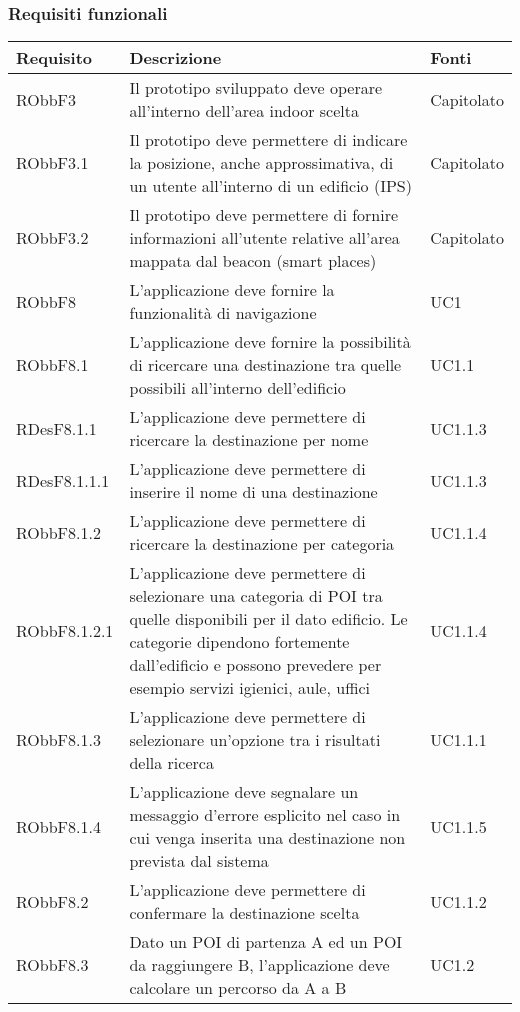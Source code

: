 \documentclass[../AnalisiDeiRequisiti.tex]{subfiles}
\begin{document}
\subsubsection{Requisiti funzionali}
\begin{longtabu} to \textwidth {X X[2] X}
\toprule
\textbf{Requisito} & \textbf{Descrizione} & \textbf{Fonti}\\
\midrule
\endhead
{}
RObbF3 & Il prototipo sviluppato deve operare all'interno dell'area indoor scelta & Capitolato \\ 
\midrule 
RObbF3.1 & Il prototipo deve permettere di indicare la posizione, anche approssimativa, di un utente all'interno di un edificio (IPS) & Capitolato \\ 
\midrule 
RObbF3.2 & Il prototipo deve permettere di fornire informazioni all'utente relative all'area mappata dal beacon (smart places) & Capitolato \\ 
\midrule 
RObbF8 & L'applicazione deve fornire la funzionalità di navigazione & UC1 \\ 
\midrule 
RObbF8.1 & L'applicazione deve fornire la possibilità di ricercare una destinazione tra quelle possibili all'interno dell'edificio & UC1.1 \\ 
\midrule 
RDesF8.1.1 & L'applicazione deve permettere di ricercare la destinazione per nome & UC1.1.3 \\ 
\midrule 
RDesF8.1.1.1 & L'applicazione deve permettere di inserire il nome di una destinazione & UC1.1.3 \\ 
\midrule 
RObbF8.1.2 & L'applicazione deve permettere di ricercare la destinazione per categoria & UC1.1.4 \\ 
\midrule 
RObbF8.1.2.1 & L'applicazione deve permettere di selezionare una categoria di POI tra quelle disponibili per il dato edificio. Le categorie dipendono fortemente dall'edificio e possono prevedere per esempio servizi igienici, aule, uffici & UC1.1.4 \\ 
\midrule 
RObbF8.1.3 & L'applicazione deve permettere di selezionare un'opzione tra i risultati della ricerca & UC1.1.1 \\ 
\midrule 
RObbF8.1.4 & L'applicazione deve segnalare un messaggio d'errore esplicito nel caso in cui venga inserita una destinazione non prevista dal sistema & UC1.1.5 \\ 
\midrule 
RObbF8.2 & L'applicazione deve permettere di confermare la destinazione scelta & UC1.1.2 \\ 
\midrule 
RObbF8.3 & Dato un POI di partenza A ed un POI da raggiungere B, l'applicazione deve calcolare un percorso da A a B & UC1.2 \\ 

\end{longtabu}
\end{document}

